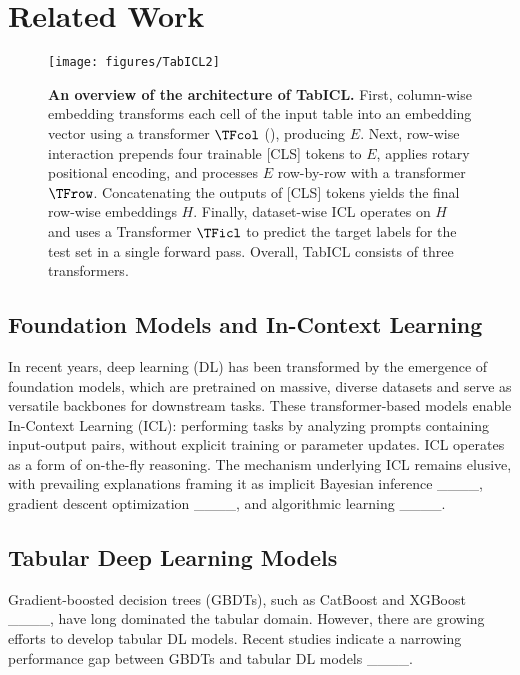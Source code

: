 \section{Related Work}
\label{sec:related}

\begin{figure*}
	\centering
	\texttt{[image: figures/TabICL2]}
	\caption{\textbf{An overview of the architecture of TabICL.} First, column-wise embedding transforms each cell of the input table into an embedding vector using a transformer $\TFcol$ (), producing $E$. Next, row-wise interaction prepends four trainable [CLS] tokens to $E$, applies rotary positional encoding, and processes $E$ row-by-row with a transformer $\TFrow$. Concatenating the outputs of [CLS] tokens yields the final row-wise embeddings $H$. Finally, dataset-wise ICL operates on $H$ and uses a Transformer $\TFicl$ to predict the target labels for the test set in a single forward pass. Overall, TabICL consists of three transformers.}
    \label{fig:arch}
\end{figure*}

\subsection{Foundation Models and In-Context Learning}

In recent years, deep learning (DL) has been transformed by the emergence of foundation models, which are pretrained on massive, diverse datasets and serve as versatile backbones for downstream tasks. These transformer-based models enable In-Context Learning (ICL): performing tasks by analyzing prompts containing input-output pairs, without explicit training or parameter updates. ICL operates as a form of on-the-fly reasoning. The mechanism underlying ICL remains elusive, with prevailing explanations framing it as implicit Bayesian inference ____, gradient descent optimization ____, and algorithmic learning ____.

\subsection{Tabular Deep Learning Models}

Gradient-boosted decision trees (GBDTs), such as CatBoost and XGBoost ____, have long dominated the tabular domain. However, there are growing efforts to develop tabular DL models. Recent studies indicate a narrowing performance gap between GBDTs and tabular DL models ____.

